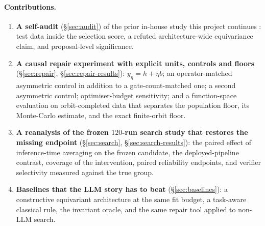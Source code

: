 \documentclass{neurips_2024}
\begin{document}
\paragraph{Contributions.}
\begin{enumerate}[leftmargin=1.4em,itemsep=2pt,topsep=2pt]
  \item \textbf{A self-audit} (\S\ref{sec:audit}) of the prior in-house study this project
  continues \cite{ho2026prior}: test data inside the selection score, a refuted
  architecture-wide equivariance claim, and proposal-level significance.
  \item \textbf{A causal repair experiment with explicit units, controls and floors}
  (\S\ref{sec:repair}, \S\ref{sec:repair-results}): $y_\eta=h+\eta b$; an
  operator-matched asymmetric control in addition to a gate-count-matched one; a
  second asymmetric control; optimiser-budget sensitivity; and a function-space
  evaluation on orbit-completed data that separates the population floor, its Monte-Carlo
  estimate, and the exact finite-orbit floor.
  \item \textbf{A reanalysis of the frozen $120$-run search study that restores the
  missing endpoint} (\S\ref{sec:search}, \S\ref{sec:search-results}): the paired effect of
  inference-time averaging on the frozen candidate, the deployed-pipeline contrast,
  coverage of the intervention, paired reliability endpoints, and verifier selectivity
  measured against the true group.
  \item \textbf{Baselines that the LLM story has to beat} (\S\ref{sec:baselines}): a
  constructive equivariant architecture at the same fit budget, a task-aware classical
  rule, the invariant oracle, and the same repair tool applied to non-LLM search.
\end{enumerate}
\end{document}
